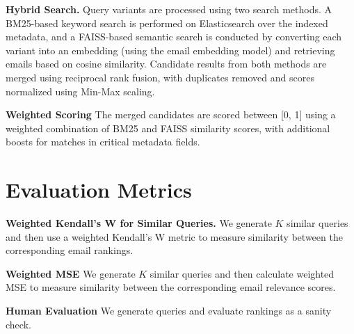 \documentclass{article}
\begin{document}
\textbf{Hybrid Search.} Query variants are processed using two search methods. A BM25-based keyword search is performed on Elasticsearch over the indexed metadata, and a FAISS-based semantic search is conducted by converting each variant into an embedding (using the email embedding model) and retrieving emails based on cosine similarity. Candidate results from both methods are merged using reciprocal rank fusion, with duplicates removed and scores normalized using Min-Max scaling.

\textbf{Weighted Scoring} The merged candidates are scored between [0, 1] using a weighted combination of BM25 and FAISS similarity scores, with additional boosts for matches in critical metadata fields.


\section{Evaluation Metrics}
\label{metrics}

\textbf{Weighted Kendall’s W for Similar Queries. } We generate $K$ similar queries and then use a weighted Kendall's W metric to measure similarity between the corresponding email rankings. 

\textbf{Weighted MSE} We generate $K$ similar queries and then calculate weighted MSE to measure similarity between the corresponding email relevance scores. 

\textbf{Human Evaluation} We generate queries and evaluate rankings as a sanity check.

\small
 

\newpage




\end{document}
